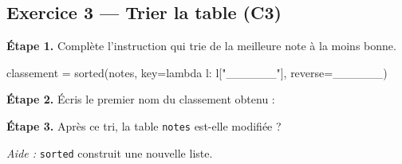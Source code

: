 \subsection*{Exercice 3 --- Trier la table (C3)}

\textbf{Étape 1.} Complète l'instruction qui trie de la meilleure note à la moins bonne.

\begin{python}
classement = sorted(notes, key=lambda l: l["______"], reverse=______)
\end{python}

\bigskip

\textbf{Étape 2.} Écris le premier nom du classement obtenu :

\medskip
\dotfill

\bigskip

\textbf{Étape 3.} Après ce tri, la table \texttt{notes} est-elle modifiée ?

\medskip
\begin{center}
 \qquad {}
\end{center}

\medskip
\textit{Aide :} \lstinline{sorted} construit une nouvelle liste.
